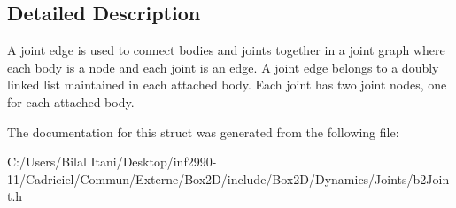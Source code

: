 \subsection{Detailed Description}
A joint edge is used to connect bodies and joints together in a joint graph where each body is a node and each joint is an edge. A joint edge belongs to a doubly linked list maintained in each attached body. Each joint has two joint nodes, one for each attached body. 

The documentation for this struct was generated from the following file\+:\begin{DoxyCompactItemize}
\item 
C\+:/\+Users/\+Bilal Itani/\+Desktop/inf2990-\/11/\+Cadriciel/\+Commun/\+Externe/\+Box2\+D/include/\+Box2\+D/\+Dynamics/\+Joints/b2\+Joint.\+h\end{DoxyCompactItemize}

